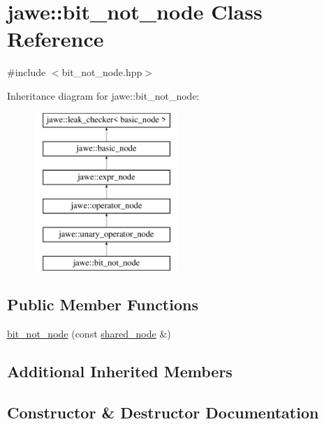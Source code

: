 \hypertarget{classjawe_1_1bit__not__node}{}\section{jawe\+:\+:bit\+\_\+not\+\_\+node Class Reference}
\label{classjawe_1_1bit__not__node}


{\ttfamily \#include $<$bit\+\_\+not\+\_\+node.\+hpp$>$}

Inheritance diagram for jawe\+:\+:bit\+\_\+not\+\_\+node\+:\begin{figure}[H]
\begin{center}
\leavevmode
\includegraphics[height=6.000000cm]{classjawe_1_1bit__not__node}
\end{center}
\end{figure}
\subsection*{Public Member Functions}
\begin{DoxyCompactItemize}
\item 
\hyperlink{classjawe_1_1bit__not__node_a2d14c296ba805a6e47eedd9286e4d7d0}{bit\+\_\+not\+\_\+node} (const \hyperlink{namespacejawe_a3f307481d921b6cbb50cc8511fc2b544}{shared\+\_\+node} \&)
\end{DoxyCompactItemize}
\subsection*{Additional Inherited Members}


\subsection{Constructor \& Destructor Documentation}
\mbox{\label{classjawe_1_1bit__not__node_a2d14c296ba805a6e47eedd9286e4d7d0}} 
